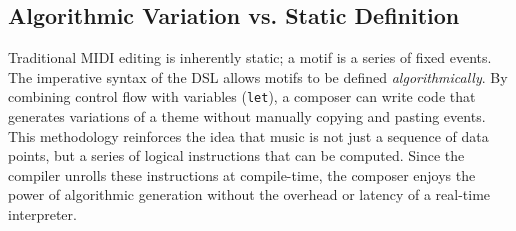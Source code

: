 \subsection{Algorithmic Variation vs. Static Definition}\label{subsec:algorithmic-variation-vs.-static-definition}

Traditional MIDI editing is inherently static; a motif is a series of fixed events.
The imperative syntax of the DSL allows motifs to be defined \textit{algorithmically}.
By combining control flow with variables (\texttt{let}), a composer can write code that generates variations of a theme
without manually copying and pasting events.
This methodology reinforces the idea that music is not just a sequence of data points, but a series of logical
instructions that can be computed.
Since the compiler unrolls these instructions at compile-time, the composer enjoys the power of algorithmic generation
without the overhead or latency of a real-time interpreter.

